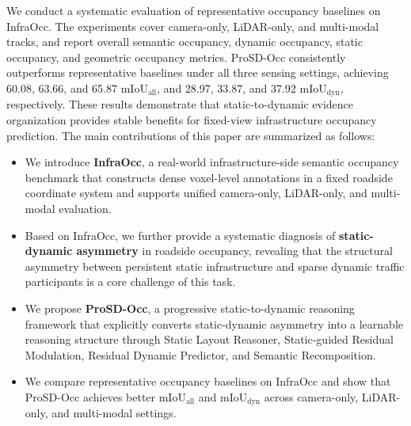 We conduct a systematic evaluation of representative occupancy baselines on
InfraOcc. The experiments cover camera-only, LiDAR-only, and multi-modal
tracks, and report overall semantic occupancy, dynamic occupancy, static
occupancy, and geometric occupancy metrics. ProSD-Occ consistently outperforms
representative baselines under all three sensing settings, achieving 60.08,
63.66, and 65.87 mIoU$_{\mathrm{all}}$, and 28.97, 33.87, and 37.92
mIoU$_{\mathrm{dyn}}$, respectively. These results demonstrate that
static-to-dynamic evidence organization provides stable benefits for
fixed-view infrastructure occupancy prediction.
The main contributions of this paper are summarized as follows:
\begin{itemize}
\item We introduce \textbf{InfraOcc}, a real-world infrastructure-side
semantic occupancy benchmark that constructs dense voxel-level annotations in
a fixed roadside coordinate system and supports unified camera-only,
LiDAR-only, and multi-modal evaluation. 

\item Based on InfraOcc, we further provide
a systematic diagnosis of \textbf{static-dynamic asymmetry} in roadside
occupancy, revealing that the structural asymmetry between persistent static
infrastructure and sparse dynamic traffic participants is a core challenge of
this task.

\item We propose \textbf{ProSD-Occ}, a progressive static-to-dynamic
reasoning framework that explicitly converts static-dynamic asymmetry into a
learnable reasoning structure through Static Layout Reasoner,
Static-guided Residual Modulation, Residual Dynamic Predictor, and Semantic
Recomposition.

\item We compare representative occupancy baselines on InfraOcc and show that
ProSD-Occ achieves better mIoU$_{\mathrm{all}}$ and
mIoU$_{\mathrm{dyn}}$ across camera-only, LiDAR-only, and multi-modal
settings.
\end{itemize}
